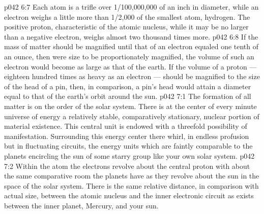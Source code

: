 \vs p042 6:7 \pc Each atom is a trifle over 1/100,000,000 of an inch in diameter, while an electron weighs a little more than 1/2,000 of the smallest atom, hydrogen. The positive proton, characteristic of the atomic nucleus, while it may be no larger than a negative electron, weighs almost two thousand times more.
\vs p042 6:8 \pc If the mass of matter should be magnified until that of an electron equaled one tenth of an ounce, then were size to be proportionately magnified, the volume of such an electron would become as large as that of the earth. If the volume of a proton --- eighteen hundred times as heavy as an electron --- should be magnified to the size of the head of a pin, then, in comparison, a pin’s head would attain a diameter equal to that of the earth’s orbit around the sun.
\vs p042 7:1 The formation of all matter is on the order of the solar system. There is at the center of every minute universe of energy a relatively stable, comparatively stationary, nuclear portion of material existence. This central unit is endowed with a threefold possibility of manifestation. Surrounding this energy center there whirl, in endless profusion but in fluctuating circuits, the energy units which are faintly comparable to the planets encircling the sun of some starry group like your own solar system.
\vs p042 7:2 \pc Within the atom the electrons revolve about the central proton with about the same comparative room the planets have as they revolve about the sun in the space of the solar system. There is the same relative distance, in comparison with actual size, between the atomic nucleus and the inner electronic circuit as exists between the inner planet, Mercury, and your sun.
